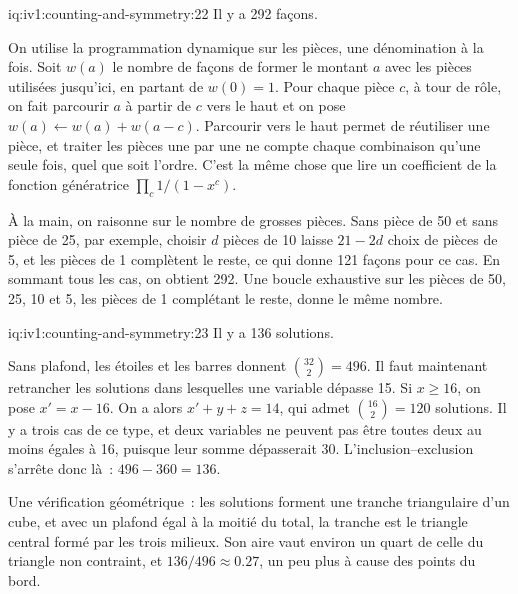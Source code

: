 \begin{solution}{iq:iv1:counting-and-symmetry:22}
Il y a 292 façons.

On utilise la programmation dynamique sur les pièces, une dénomination à la fois. Soit $w(a)$ le nombre de façons de former le montant $a$ avec les pièces utilisées jusqu'ici, en partant de $w(0) = 1$. Pour chaque pièce $c$, à tour de rôle, on fait parcourir $a$ à partir de $c$ vers le haut et on pose $w(a) \leftarrow w(a) + w(a - c)$. Parcourir vers le haut permet de réutiliser une pièce, et traiter les pièces une par une ne compte chaque combinaison qu'une seule fois, quel que soit l'ordre. C'est la même chose que lire un coefficient de la fonction génératrice $\prod_c 1/(1 - x^c)$.

À la main, on raisonne sur le nombre de grosses pièces. Sans pièce de 50 et sans pièce de 25, par exemple, choisir $d$ pièces de 10 laisse $21 - 2d$ choix de pièces de 5, et les pièces de 1 complètent le reste, ce qui donne 121 façons pour ce cas. En sommant tous les cas, on obtient 292. Une boucle exhaustive sur les pièces de 50, 25, 10 et 5, les pièces de 1 complétant le reste, donne le même nombre.

\end{solution}

\begin{solution}{iq:iv1:counting-and-symmetry:23}
Il y a 136 solutions.

Sans plafond, les étoiles et les barres donnent $\binom{32}{2} = 496$. Il faut maintenant retrancher les solutions dans lesquelles une variable dépasse 15. Si $x \ge 16$, on pose $x' = x - 16$. On a alors $x' + y + z = 14$, qui admet $\binom{16}{2} = 120$ solutions. Il y a trois cas de ce type, et deux variables ne peuvent pas être toutes deux au moins égales à 16, puisque leur somme dépasserait 30. L'inclusion--exclusion s'arrête donc là~: $496 - 360 = 136$.

Une vérification géométrique~: les solutions forment une tranche triangulaire d'un cube, et avec un plafond égal à la moitié du total, la tranche est le triangle central formé par les trois milieux. Son aire vaut environ un quart de celle du triangle non contraint, et $136/496 \approx 0.27$, un peu plus à cause des points du bord.

\end{solution}

